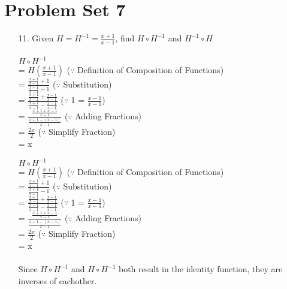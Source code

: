 \documentclass[12pt]{article}
\begin{document}
\section*{Problem Set 7}
\begin{itemize}
    \item [11.]
        Given $H = H^{-1} = \frac{x + 1}{x - 1}$, find $H \circ H^{-1}$ and $H^{-1}
            \circ H$ \\
        \\
        $H \circ H^{-1}$ \\
        = $H(\frac{x + 1}{x - 1})$ \hspace{6em} ($\because$ Definition of Composition of
            Functions) \\
        = $\frac{\frac{x + 1}{x - 1} + 1}{\frac{x + 1}{x - 1} - 1}$ \hspace{6em} ($\because$
            Substitution) \\
        = $\frac{\frac{x + 1}{x - 1} + \frac{x - 1}{x - 1}}{\frac{x + 1}{x - 1} - \frac{x - 1}{x - 1}}$
            \hspace{6em} ($\because$ 1 = $\frac{x - 1}{x - 1}$) \\
        = $\frac{\frac{x + 1 + x - 1}{x - 1}}{\frac{x + 1 - (x - 1)}{x - 1}}$
            \hspace{6em} ($\because$ Adding Fractions) \\
        = $\frac{2x}{2}$ \hspace{8em} ($\because$ Simplify Fraction) \\
        = x \\
        
        \newpage
        
        $H \circ H^{-1}$ \\
        = $H(\frac{x + 1}{x - 1})$ \hspace{6em} ($\because$ Definition of Composition of
            Functions) \\
        = $\frac{\frac{x + 1}{x - 1} + 1}{\frac{x + 1}{x - 1} - 1}$ \hspace{6em} ($\because$
            Substitution) \\
        = $\frac{\frac{x + 1}{x - 1} + \frac{x - 1}{x - 1}}{\frac{x + 1}{x - 1} - \frac{x - 1}{x - 1}}$
            \hspace{6em} ($\because$ 1 = $\frac{x - 1}{x - 1}$) \\
        = $\frac{\frac{x + 1 + x - 1}{x - 1}}{\frac{x + 1 - (x - 1)}{x - 1}}$
            \hspace{6em} ($\because$ Adding Fractions) \\
        = $\frac{2x}{2}$ \hspace{8em} ($\because$ Simplify Fraction) \\
        = x \\
        \\
        Since $H \circ H^{-1}$ and $H \circ H^{-1}$ both result in the identity function,
        they are inverses of eachother.

\end{itemize}
\end{document}
